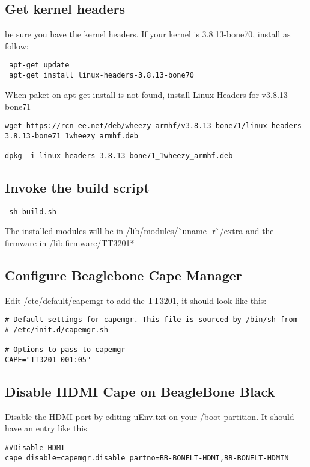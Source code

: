 \subsection{Get kernel headers}
be sure you have the kernel headers. If your kernel is 3.8.13-bone70,
install as follow:

\begin{lstlisting}
 apt-get update
 apt-get install linux-headers-3.8.13-bone70
\end{lstlisting}

When paket on apt-get install is not found, install Linux Headers for v3.8.13-bone71

\begin{lstlisting}
wget https://rcn-ee.net/deb/wheezy-armhf/v3.8.13-bone71/linux-headers-3.8.13-bone71_1wheezy_armhf.deb 

dpkg -i linux-headers-3.8.13-bone71_1wheezy_armhf.deb 
\end{lstlisting}

\subsection{Invoke the build script}
\begin{lstlisting}
 sh build.sh
 \end{lstlisting}

The installed modules will be in \url{/lib/modules/`uname -r`/extra} and the firmware in \url{/lib.firmware/TT3201*}

\subsection{Configure Beaglebone Cape Manager}
Edit \url{/etc/default/capemgr} to add the TT3201, it should look like this:

\begin{lstlisting}
# Default settings for capemgr. This file is sourced by /bin/sh from
# /etc/init.d/capemgr.sh

# Options to pass to capemgr
CAPE="TT3201-001:05"
\end{lstlisting}


\subsection{Disable HDMI Cape on BeagleBone Black}
Disable the HDMI port by editing uEnv.txt on your \url{/boot} partition.
It should have an entry like this

\begin{lstlisting}
##Disable HDMI
cape_disable=capemgr.disable_partno=BB-BONELT-HDMI,BB-BONELT-HDMIN
\end{lstlisting}


